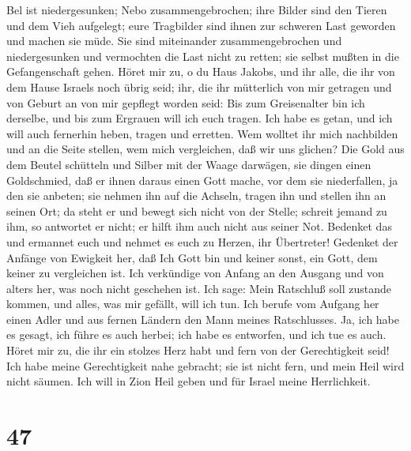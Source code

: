  Bel ist niedergesunken; Nebo zusammengebrochen; ihre
Bilder sind den Tieren und dem Vieh aufgelegt; eure Tragbilder sind
ihnen zur schweren Last geworden und machen sie müde.  Sie
sind miteinander zusammengebrochen und niedergesunken und vermochten die
Last nicht zu retten; sie selbst mußten in die Gefangenschaft gehen.
 Höret mir zu, o du Haus Jakobs, und ihr alle, die ihr von
dem Hause Israels noch übrig seid; ihr, die ihr mütterlich von mir
getragen und von Geburt an von mir gepflegt worden seid: 
Bis zum Greisenalter bin ich derselbe, und bis zum Ergrauen will ich
euch tragen. Ich habe es getan, und ich will auch fernerhin heben,
tragen und erretten.  Wem wolltet ihr mich nachbilden und
an die Seite stellen, wem mich vergleichen, daß wir uns glichen?
 Die Gold aus dem Beutel schütteln und Silber mit der
Waage darwägen, sie dingen einen Goldschmied, daß er ihnen daraus einen
Gott mache, vor dem sie niederfallen, ja den sie anbeten; 
sie nehmen ihn auf die Achseln, tragen ihn und stellen ihn an seinen
Ort; da steht er und bewegt sich nicht von der Stelle; schreit jemand zu
ihm, so antwortet er nicht; er hilft ihm auch nicht aus seiner Not.
 Bedenket das und ermannet euch und nehmet es euch zu
Herzen, ihr Übertreter!  Gedenket der Anfänge von Ewigkeit
her, daß Ich Gott bin und keiner sonst, ein Gott, dem keiner zu
vergleichen ist.  Ich verkündige von Anfang an den
Ausgang und von alters her, was noch nicht geschehen ist. Ich sage: Mein
Ratschluß soll zustande kommen, und alles, was mir gefällt, will ich
tun.  Ich berufe vom Aufgang her einen Adler und aus
fernen Ländern den Mann meines Ratschlusses. Ja, ich habe es gesagt, ich
führe es auch herbei; ich habe es entworfen, und ich tue es auch.
 Höret mir zu, die ihr ein stolzes Herz habt und fern von
der Gerechtigkeit seid!  Ich habe meine Gerechtigkeit
nahe gebracht; sie ist nicht fern, und mein Heil wird nicht säumen. Ich
will in Zion Heil geben und für Israel meine Herrlichkeit.

\hypertarget{section-46}{%
\section{47}\label{section-46}}


